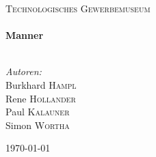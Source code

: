 \begin{titlepage}
	
	\center
	
	\textsc{\LARGE Technologisches Gewerbemuseum}\\[1.5cm]
	
	\HRule
	\\[0.4cm]
	{\huge \bfseries Manner}
	\\[0.2cm]
	{\LARGE \documentName}
	\HRule
	\\[1.5cm]
	
	\begin{minipage}{0.5\textwidth}
		\begin{center} \large
			\emph{Autoren:}\\
			Burkhard \textsc{Hampl}\\
			Rene \textsc{Hollander}\\
			Paul \textsc{Kalauner}\\
			Simon \textsc{Wortha}
		\end{center}
	\end{minipage}
	
	\null
	\vfill
	{\large \today}
	
\end{titlepage}
